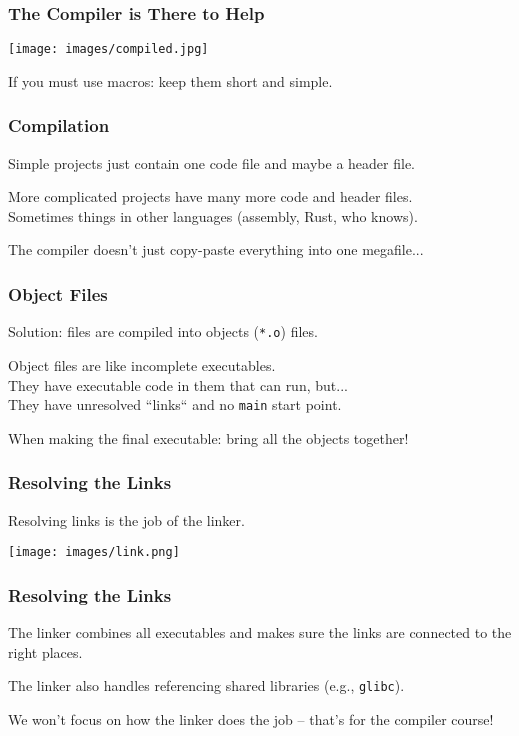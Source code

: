 \begin{frame}
\frametitle{The Compiler is There to Help}

\begin{center}
  \texttt{[image: images/compiled.jpg]}
\end{center}

If you must use macros: keep them short and simple.

\end{frame}

\begin{frame}
\frametitle{Compilation}

Simple projects just contain one code file and maybe a header file.

More complicated projects have many more code and header files.\\
\quad Sometimes things in other languages (assembly, Rust, who knows).

The compiler doesn't just copy-paste everything into one megafile...

\end{frame}

\begin{frame}
\frametitle{Object Files}

Solution: files are compiled into objects (\texttt{*.o}) files.

Object files are like incomplete executables.\\
\quad They have executable code in them that can run, but...\\
\quad They have unresolved ``links`` and no \texttt{main} start point.

When making the final executable: bring all the objects together!

\end{frame}

\begin{frame}
\frametitle{Resolving the Links}

Resolving links is the job of the \alert{linker}.

\begin{center}
  \texttt{[image: images/link.png]}
\end{center}

\end{frame}

\begin{frame}
\frametitle{Resolving the Links}
The linker combines all executables and makes sure the links are connected to the right places.

The linker also handles referencing shared libraries (e.g., \texttt{glibc}).

We won't focus on how the linker does the job -- that's for the compiler course!

\end{frame}


